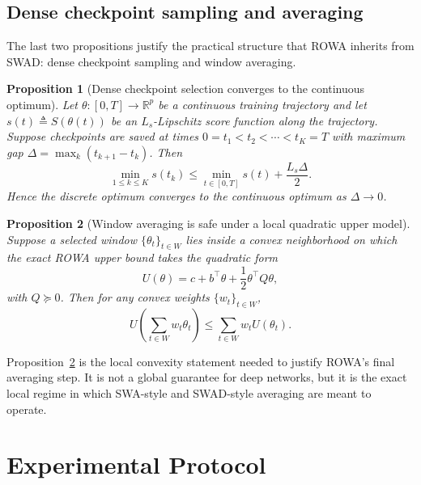 \documentclass{article}
\newtheorem{proposition}{Proposition}
\newcommand{\RR}{\mathbb{R}}
\newcommand{\rowa}{\textup{\textsc{ROWA}}}
\newcommand{\swad}{\textup{\textsc{SWAD}}}
\begin{document}
\subsection{Dense checkpoint sampling and averaging}

The last two propositions justify the practical structure that \rowa{} inherits from \swad{}: dense checkpoint sampling and window averaging.

\begin{proposition}[Dense checkpoint selection converges to the continuous optimum]
\label{prop:dense}
Let $\theta:[0,T]\to\RR^p$ be a continuous training trajectory and let $s(t) \triangleq S(\theta(t))$ be an $L_s$-Lipschitz score function along the trajectory. Suppose checkpoints are saved at times $0=t_1< t_2 < \cdots < t_K=T$ with maximum gap $\Delta = \max_k (t_{k+1}-t_k)$. Then
\begin{equation}
    \min_{1\le k\le K} s(t_k)
    \le
    \min_{t\in[0,T]} s(t) + \frac{L_s \Delta}{2}.
\end{equation}
Hence the discrete optimum converges to the continuous optimum as $\Delta \to 0$.
\end{proposition}

\begin{proposition}[Window averaging is safe under a local quadratic upper model]
\label{prop:avg}
Suppose a selected window $\{\theta_t\}_{t\in W}$ lies inside a convex neighborhood on which the exact \rowa{} upper bound takes the quadratic form
\begin{equation}
    U(\theta) = c + b^\top \theta + \frac{1}{2}\theta^\top Q \theta,
\end{equation}
with $Q \succeq 0$. Then for any convex weights $\{w_t\}_{t\in W}$,
\begin{equation}
    U\!\left(\sum_{t\in W} w_t \theta_t \right)
    \le
    \sum_{t\in W} w_t U(\theta_t).
\end{equation}
\end{proposition}

Proposition~\ref{prop:avg} is the local convexity statement needed to justify \rowa{}'s final averaging step. It is not a global guarantee for deep networks, but it is the exact local regime in which SWA-style and \swad{}-style averaging are meant to operate.

\section{Experimental Protocol}
\label{sec:experiments}
\end{document}
